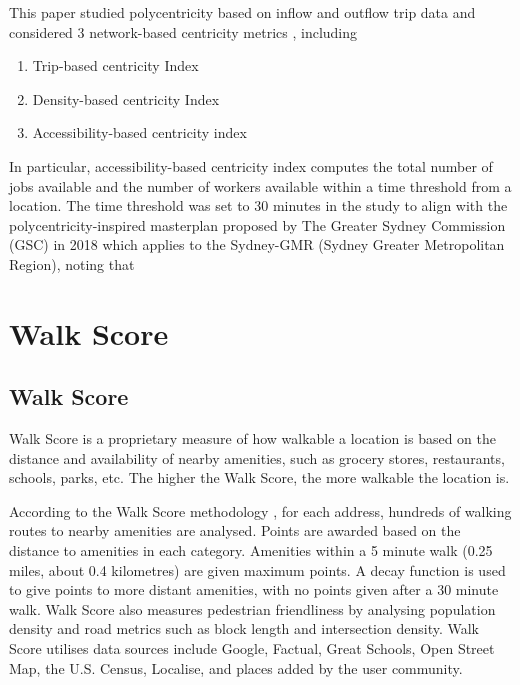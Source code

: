 This paper studied polycentricity based on inflow and outflow trip data and considered 3 network-based centricity metrics \cite{sarkar_measuring_2020}, including

\begin{enumerate}
    \item Trip-based centricity Index
    \item Density-based centricity Index
    \item Accessibility-based centricity index
\end{enumerate}

In particular, accessibility-based centricity index computes the total number of jobs available and the number of workers available within a time threshold from a location. The time threshold was set to 30 minutes in the study to align with the polycentricity-inspired masterplan proposed by The Greater Sydney Commission (GSC) in 2018 which applies to the Sydney-GMR (Sydney Greater Metropolitan Region), noting that 

\section{Walk Score}

\subsection{Walk Score}

Walk Score is a proprietary measure of how walkable a location is based on the distance and availability of nearby amenities, such as grocery stores, restaurants, schools, parks, etc. The higher the Walk Score, the more walkable the location is.

According to the Walk Score methodology \cite{walkscore}, for each address, hundreds of walking routes to nearby amenities are analysed. Points are awarded based on the distance to amenities in each category. Amenities within a 5 minute walk (0.25 miles, about 0.4 kilometres) are given maximum points. A decay function is used to give points to more distant amenities, with no points given after a 30 minute walk. Walk Score also measures pedestrian friendliness by analysing population density and road metrics such as block length and intersection density. Walk Score utilises data sources include Google, Factual, Great Schools, Open Street Map, the U.S. Census, Localise, and places added by the user community.

